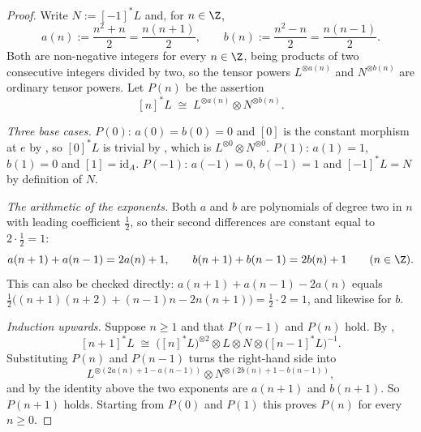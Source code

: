 \begin{proof}
Write $N:=[-1]^*L$ and, for $n\in\Z$,
\[
  a(n):=\frac{n^2+n}2=\frac{n(n+1)}2,\qquad
  b(n):=\frac{n^2-n}2=\frac{n(n-1)}2 .
\]
Both are non-negative integers for every $n\in\Z$, being products of two
consecutive integers divided by two, so the tensor powers $L^{\otimes a(n)}$
and $N^{\otimes b(n)}$ are ordinary tensor powers.  Let $P(n)$ be the assertion
\[
  [n]^*L\;\cong\;L^{\otimes a(n)}\otimes N^{\otimes b(n)} .
\]

\emph{Three base cases.}  $P(0)$: $a(0)=b(0)=0$ and $[0]$ is the constant
morphism at $e$ by , so $[0]^*L$ is trivial by
, which is $L^{}\otimes N^{}$.
$P(1)$: $a(1)=1$, $b(1)=0$ and $[1]=_A$.  $P(-1)$: $a(-1)=0$,
$b(-1)=1$ and $[-1]^*L=N$ by definition of $N$.

\emph{The arithmetic of the exponents.}  Both $a$ and $b$ are polynomials of
degree two in $n$ with leading coefficient $$, so their second
differences are constant equal to $2\cdot{}=1$:
\[
  a(n+1)+a(n-1)=2a(n)+1,\qquad b(n+1)+b(n-1)=2b(n)+1
  \qquad(n\in\Z).
\]
This can also be checked directly: $a(n+1)+a(n-1)-2a(n)$ equals
$\bigl((n+1)(n+2)+(n-1)n-2n(n+1)\bigr)==1$, and likewise
for $b$.

\emph{Induction upwards.}  Suppose $n$ and that $P(n-1)$ and $P(n)$ hold.
By ,
\[
  [n+1]^*L\;\cong\;\bigl([n]^*L\bigr)^{\otimes2}\otimes L\otimes N\otimes
  \bigl([n-1]^*L\bigr)^{-1} .
\]
Substituting $P(n)$ and $P(n-1)$ turns the right-hand side into
\[
  L^{\otimes\left(2a(n)+1-a(n-1)\right)}\otimes
  N^{\otimes\left(2b(n)+1-b(n-1)\right)} ,
\]
and by the identity above the two exponents are $a(n+1)$ and $b(n+1)$.  So
$P(n+1)$ holds.  Starting from $P(0)$ and $P(1)$ this proves $P(n)$ for every
$n$.


\end{proof}
